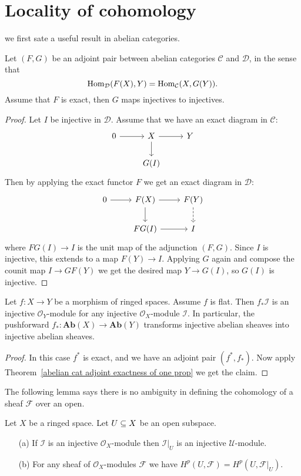 \section{Locality of cohomology}
we first sate a useful result in abelian categories.
\begin{theorem}\label{abelian cat adjoint exactness of one prop}
Let $(F,G)$ be an adjoint pair between abelian categories $\mathcal{C}$ and $\mathcal{D}$, in the sense that
\[\mathrm{Hom}_{\mathcal{D}}(F(X),Y)=\mathrm{Hom}_{\mathcal{C}}(X,G(Y)).\]
Assume that $F$ is exact, then $G$ maps injectives to injectives.
\end{theorem}
\begin{proof}
Let $I$ be injective in $\mathcal{D}$. Assume that we have an exact diagram in $\mathcal{C}$:
\[\begin{tikzcd}
0\ar[r]&X\ar[r]\ar[d]&Y\\
&G(I)
\end{tikzcd}\]
Then by applying the exact functor $F$ we get an exact diagram in $\mathcal{D}$:
\[\begin{tikzcd}
0\ar[r]&F(X)\ar[r]\ar[d]&F(Y)\ar[d,dashed]\\
&FG(I)\ar[r]&I
\end{tikzcd}\]
where $FG(I)\to I$ is the unit map of the adjunction $(F,G)$. Since $I$ is injective, this extends to a map $F(Y)\to I$. Applying $G$ again and compose the counit map $I\to GF(Y)$ we get the desired map $Y\to G(I)$, so $G(I)$ is injective.
\end{proof}
\begin{proposition}
Let $f:X\to Y$ be a morphism of ringed spaces. Assume $f$ is flat. Then $f_*\mathscr{I}$ is an injective $\mathscr{O}_Y$-module for any injective $\mathscr{O}_X$-module $\mathscr{I}$. In particular, the pushforward $f_*:\mathbf{Ab}(X)\to\mathbf{Ab}(Y)$ transforms injective abelian sheaves into injective abelian sheaves.
\end{proposition}
\begin{proof}
In this case $f^*$ is exact, and we have an adjoint pair $(f^*,f_*)$. Now apply Theorem~\ref{abelian cat adjoint exactness of one prop} we get the claim.
\end{proof}
The following lemma says there is no ambiguity in defining the cohomology of a sheaf $\mathscr{F}$ over an open.
\begin{lemma}
Let $X$ be a ringed space. Let $U\subseteq X$ be an open subspace.
\begin{itemize}
\item[(a)] If $\mathscr{I}$ is an injective $\mathcal{O}_X$-module then $\mathscr{I}|_U$ is an injective $\mathcal{U}$-module.
\item[(b)] For any sheaf of $\mathcal{O}_X$-modules $\mathscr{F}$ we have $H^p(U,\mathscr{F})=H^p(U,\mathscr{F}|_U)$.
\end{itemize}
\end{lemma}
